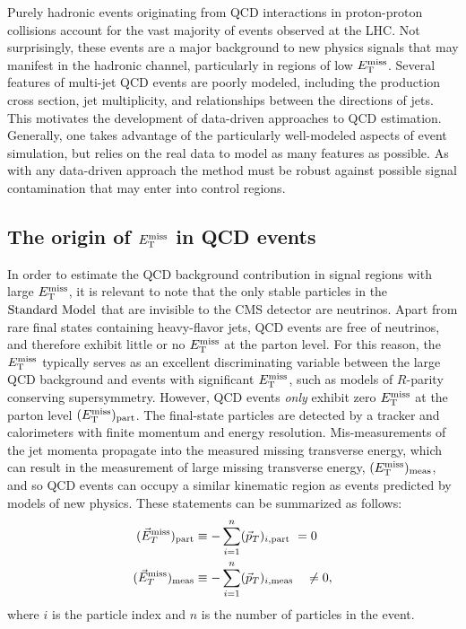 
Purely hadronic events originating from QCD interactions in proton-proton collisions account for the vast majority of events observed at the LHC. Not surprisingly, these events are a major background to new physics signals that may manifest in the hadronic channel, particularly in regions of low $E_{\text{T}}^{\rm miss}$. Several features of multi-jet QCD events are poorly modeled, including the production cross section, jet multiplicity, and relationships between the directions of jets. This motivates the development of data-driven approaches to QCD estimation. Generally, one takes advantage of the particularly well-modeled aspects of event simulation, but relies on the real data to model as many features as possible. As with any data-driven approach the method must be robust against possible signal contamination that may enter into control regions. 

\subsection{The origin of $E_{\text{T}}^{\rm miss}$ in QCD events}
In order to estimate the QCD background contribution in signal regions with large $E_{\text{T}}^{\rm miss}$, it is relevant to note that the only stable particles in the $\text{Standard\ Model}$ that are invisible to the CMS detector are neutrinos. Apart from rare final states containing heavy-flavor jets,  QCD events are free of neutrinos, and therefore exhibit little or no $E_{\text{T}}^{\rm miss}$ at the parton level.  For this reason, the $E_{\text{T}}^{\rm miss}$ typically serves as an excellent discriminating variable between the large QCD background and events with significant $E_{\text{T}}^{\rm miss}$, such as models of $R$-parity conserving supersymmetry. However, QCD events {\it only} exhibit zero $E_{\text{T}}^{\rm miss}$ at the parton level $(E_{\text{T}}^{\rm miss})_{\rm part}$. The final-state particles are detected by a tracker and calorimeters with finite momentum and energy resolution. Mis-measurements of the jet momenta propagate into the measured missing transverse energy, which can result in the measurement of large missing transverse energy, $(E_{\text{T}}^{\rm miss})_{\rm meas}$, and so QCD events can occupy a similar kinematic region as events predicted by models of new physics.  These statements can be summarized as follows:
\begin{align}
(\vec{E}_{ T}^{\rm miss})_{\rm part} &\equiv -\sum_{i=1}^{n}(\vec{p}_{T})_{i,\rm part\ }=0\\
(\vec{E}_{ T}^{\rm miss})_{\rm meas} &\equiv -\sum_{i=1}^{n}(\vec{p}_{T})_{i,\rm meas\ \ \ }\neq 0,
\label{eq:metTrue}
\end{align}
where $i$ is the particle index and $n$ is the number of particles in the event.

